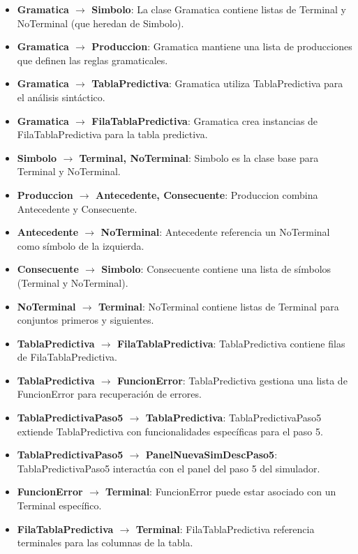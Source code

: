 \begin{itemize}
    \item \textbf{Gramatica $\rightarrow$ Simbolo}: La clase Gramatica contiene listas de Terminal y NoTerminal (que heredan de Simbolo).
    \item \textbf{Gramatica $\rightarrow$ Produccion}: Gramatica mantiene una lista de producciones que definen las reglas gramaticales.
    \item \textbf{Gramatica $\rightarrow$ TablaPredictiva}: Gramatica utiliza TablaPredictiva para el análisis sintáctico.
    \item \textbf{Gramatica $\rightarrow$ FilaTablaPredictiva}: Gramatica crea instancias de FilaTablaPredictiva para la tabla predictiva.
    \item \textbf{Simbolo $\rightarrow$ Terminal, NoTerminal}: Simbolo es la clase base para Terminal y NoTerminal.
    \item \textbf{Produccion $\rightarrow$ Antecedente, Consecuente}: Produccion combina Antecedente y Consecuente.
    \item \textbf{Antecedente $\rightarrow$ NoTerminal}: Antecedente referencia un NoTerminal como símbolo de la izquierda.
    \item \textbf{Consecuente $\rightarrow$ Simbolo}: Consecuente contiene una lista de símbolos (Terminal y NoTerminal).
    \item \textbf{NoTerminal $\rightarrow$ Terminal}: NoTerminal contiene listas de Terminal para conjuntos primeros y siguientes.
    \item \textbf{TablaPredictiva $\rightarrow$ FilaTablaPredictiva}: TablaPredictiva contiene filas de FilaTablaPredictiva.
    \item \textbf{TablaPredictiva $\rightarrow$ FuncionError}: TablaPredictiva gestiona una lista de FuncionError para recuperación de errores.
    \item \textbf{TablaPredictivaPaso5 $\rightarrow$ TablaPredictiva}: TablaPredictivaPaso5 extiende TablaPredictiva con funcionalidades específicas para el paso 5.
    \item \textbf{TablaPredictivaPaso5 $\rightarrow$ PanelNuevaSimDescPaso5}: TablaPredictivaPaso5 interactúa con el panel del paso 5 del simulador.
    \item \textbf{FuncionError $\rightarrow$ Terminal}: FuncionError puede estar asociado con un Terminal específico.
    \item \textbf{FilaTablaPredictiva $\rightarrow$ Terminal}: FilaTablaPredictiva referencia terminales para las columnas de la tabla.
\end{itemize}

